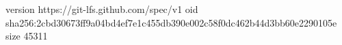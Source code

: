version https://git-lfs.github.com/spec/v1
oid sha256:2cbd30673ff9a04bd4ef7e1c455db390e002c58f0dc462b44d3bb60e2290105e
size 45311

